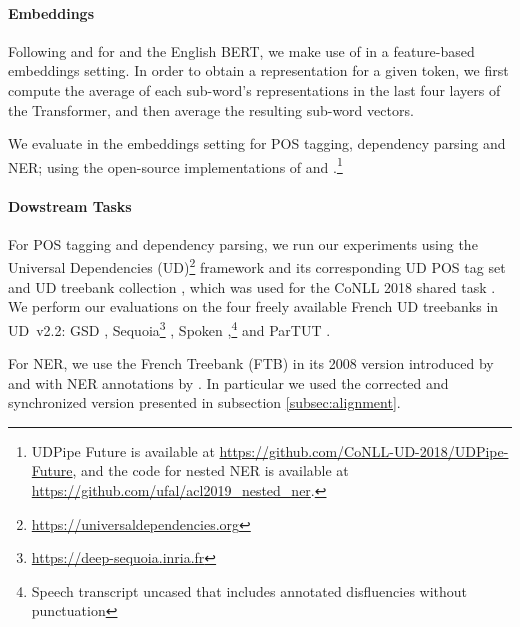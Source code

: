 \paragraph{Embeddings}

Following \citet{strakova-etal-2019-neural} and \citet{straka-strakova-2019-evaluating} for \mbert and the English BERT, we make use of \camembert in a feature-based embeddings setting. In order to obtain a representation for a given token, we first compute the average of each sub-word’s representations in the last four layers of the Transformer, and then average the resulting sub-word vectors.

We evaluate \camembert in the embeddings setting for POS tagging, dependency parsing and NER; using the open-source implementations of \citet{straka-strakova-2019-evaluating} and \citet{strakova-etal-2019-neural}.\footnote{UDPipe Future is available at \url{https://github.com/CoNLL-UD-2018/UDPipe-Future}, and the code for nested NER is available at \url{https://github.com/ufal/acl2019_nested_ner}.}


\paragraph{Dowstream Tasks}

For POS tagging and dependency parsing, we run our experiments using the Universal Dependencies (UD)\footnote{\url{https://universaldependencies.org}} framework and its corresponding UD POS tag set \citep{petrov-etal-2012-universal} and UD treebank collection \citep{nivre-etal-2018-universal}, which was used for the CoNLL 2018 shared task \citep{seker-etal-2018-universal}. We perform our evaluations on the four freely available French UD treebanks in UD~v2.2: GSD \citep{mcdonald-etal-2013-universal}, Sequoia\footnote{\url{https://deep-sequoia.inria.fr}} \citep{candito-seddah-2012-le,candito-etal-2014-deep}, Spoken \citep{lacheret-etal-2014-rhapsodie,bawden-etal-2014-correcting},\footnote{Speech transcript uncased that includes annotated disfluencies without punctuation} and ParTUT \cite{sanguinetti-Bosco-2015-parttut}.

For NER, we use the French Treebank (FTB) \citep{abeille-etal-2003-building} in its 2008 version introduced by \citet{candito-crabbe-2009-improving} and with NER annotations by \citet{sagot-etal-2012-annotation}. In particular we used the corrected and synchronized version \citep{ortiz-suarez-etal-2020-establishing} presented in subsection \ref{subsec:alignment}.

